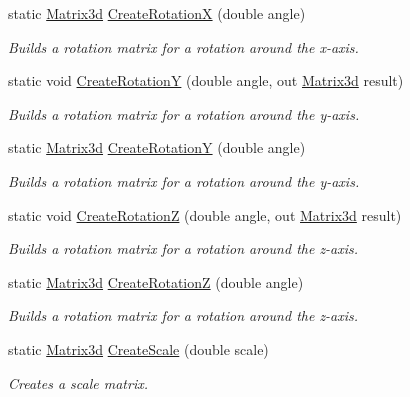 \begin{DoxyCompactItemize}
static \hyperlink{struct_open_t_k_1_1_matrix3d}{Matrix3d} \hyperlink{struct_open_t_k_1_1_matrix3d_ab18a3b46af76d5236aeecc4ca1b19cc2}{Create\-Rotation\-X} (double angle)
\begin{DoxyCompactList}\small\item\em Builds a rotation matrix for a rotation around the x-\/axis. \end{DoxyCompactList}\item 
static void \hyperlink{struct_open_t_k_1_1_matrix3d_a17e9f8d1643f26d848d88e533604ab0e}{Create\-Rotation\-Y} (double angle, out \hyperlink{struct_open_t_k_1_1_matrix3d}{Matrix3d} result)
\begin{DoxyCompactList}\small\item\em Builds a rotation matrix for a rotation around the y-\/axis. \end{DoxyCompactList}\item 
static \hyperlink{struct_open_t_k_1_1_matrix3d}{Matrix3d} \hyperlink{struct_open_t_k_1_1_matrix3d_a907ce88f41aac8c45373a41da25d02c7}{Create\-Rotation\-Y} (double angle)
\begin{DoxyCompactList}\small\item\em Builds a rotation matrix for a rotation around the y-\/axis. \end{DoxyCompactList}\item 
static void \hyperlink{struct_open_t_k_1_1_matrix3d_a0222785da51dc6c9c4cd3db88ba5d780}{Create\-Rotation\-Z} (double angle, out \hyperlink{struct_open_t_k_1_1_matrix3d}{Matrix3d} result)
\begin{DoxyCompactList}\small\item\em Builds a rotation matrix for a rotation around the z-\/axis. \end{DoxyCompactList}\item 
static \hyperlink{struct_open_t_k_1_1_matrix3d}{Matrix3d} \hyperlink{struct_open_t_k_1_1_matrix3d_a7b0de6e21643eec834d3a50ae3767d58}{Create\-Rotation\-Z} (double angle)
\begin{DoxyCompactList}\small\item\em Builds a rotation matrix for a rotation around the z-\/axis. \end{DoxyCompactList}\item 
static \hyperlink{struct_open_t_k_1_1_matrix3d}{Matrix3d} \hyperlink{struct_open_t_k_1_1_matrix3d_a75fb12316f28ac03e2335b09104700b2}{Create\-Scale} (double scale)
\begin{DoxyCompactList}\small\item\em Creates a scale matrix. \end{DoxyCompactList}\item 

\end{DoxyCompactItemize}
